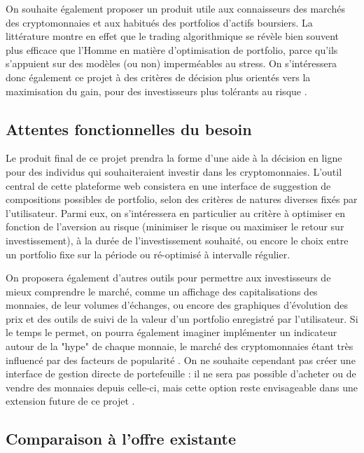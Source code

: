 \documentclass[a4paper]{article}
\begin{document}
On souhaite également proposer un produit utile aux connaisseurs des marchés des cryptomonnaies et aux habitués des portfolios d'actifs boursiers. La littérature \cite{Chaboud2014} montre en effet que le trading algorithmique se révèle bien souvent plus efficace que l'Homme en matière d'optimisation de portfolio, parce qu'ils s'appuient sur des modèles (ou non) imperméables au stress. On s'intéressera donc également ce projet à des critères de décision plus orientés vers la maximisation du gain, pour des investisseurs plus tolérants au risque \cite{Li2014}.

\subsection{Attentes fonctionnelles du besoin}

Le produit final de ce projet prendra la forme d'une aide à la décision en ligne pour des individus qui souhaiteraient investir dans les cryptomonnaies. L'outil central de cette plateforme web consistera en une interface de suggestion de compositions possibles de portfolio, selon des critères de natures diverses fixés par l'utilisateur. Parmi eux, on s'intéressera en particulier au critère à optimiser en fonction de l'aversion au risque (minimiser le risque ou maximiser le retour sur investissement), à la durée de l'investissement souhaité, ou encore le choix entre un portfolio fixe sur la période ou ré-optimisé à intervalle régulier.

On proposera également d'autres outils pour permettre aux investisseurs de mieux comprendre le marché, comme un affichage des capitalisations des monnaies, de leur volumes d'échanges, ou encore des graphiques d'évolution des prix et des outils de suivi de la valeur d'un portfolio enregistré par l'utilisateur. Si le temps le permet, on pourra également imaginer implémenter un indicateur autour de la "hype" de chaque monnaie, le marché des cryptomonnaies étant très influencé par des facteurs de popularité \cite{Colianni2015}. On ne souhaite cependant pas créer une interface de gestion directe de portefeuille : il ne sera pas possible d'acheter ou de vendre des monnaies depuis celle-ci, mais cette option  reste envisageable dans une extension future de ce projet \cite{Madan2014}.

\subsection{Comparaison à l'offre existante}
\end{document}
